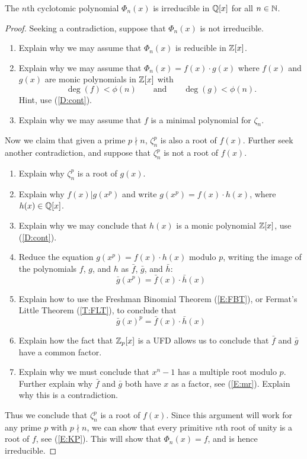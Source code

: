 \documentclass{ximera}
\begin{document}
\begin{theorem} 
  The $n$th cyclotomic polynomial $\Phi_n(x)$ is irreducible in $\mathbb Q[x]$
  for all $n\in \mathbb N$.
  \begin{proof} 
    Seeking a contradiction, suppose that $\Phi_n(x)$ is not irreducible.
    \begin{enumerate}
    \item Explain why we may assume that $\Phi_n(x)$ is reducible in
      $\mathbb Z[x]$.
    \item Explain why we may assume that $\Phi_n(x) = f(x)\cdot g(x)$
      where $f(x)$ and $g(x)$ are monic polynomials in $\mathbb Z[x]$ with
      \[
      \deg(f) < \phi(n) \qquad \text{and}\qquad \deg(g) < \phi(n).
      \]
      Hint, use (\ref{D:cont}).
\item Explain why we may assume that $f$ is a minimal polynomial for
  $\zeta_n$.
    \end{enumerate}
    Now we claim that given a prime $p \nmid n$, $\zeta_n^p$ is also a
    root of $f(x)$. Further seek another contradiction, and suppose that
    $\zeta_n^p$ is not a root of $f(x)$.
    \begin{enumerate}
    \item Explain why $\zeta_n^p$ is a root of $g(x)$.
    \item Explain why $f(x) | g(x^p)$ and write $g(x^p) = f(x) \cdot
      h(x)$, where $h(x)\in \mathbb Q[x]$.
    \item Explain why we may conclude that $h(x)$ is a monic polynomial
      $\mathbb Z[x]$, use (\ref{D:cont}).
    \item Reduce the equation $g(x^p) = f(x) \cdot h(x)$ modulo $p$,
      writing the image of the polynomials $f$, $g$, and $h$ as $\bar{f}$,
      $\bar{g}$, and $\bar{h}$:
      \[
      \bar{g}(x^p) = \bar{f}(x) \cdot \bar{h}(x)
      \]
    \item Explain how to use the Freshman Binomial Theorem (\ref{E:FBT}),
      or Fermat's Little Theorem (\ref{T:FLT}), to conclude that
      \[
      \bar{g}(x)^p = \bar{f}(x) \cdot \bar{h}(x)
      \]
    \item Explain how the fact that $\mathbb Z_p[x]$ is a UFD allows us to
      conclude that $\bar{f}$ and $\bar{g}$ have a common factor.
    \item Explain why we must conclude that $x^n-1$ has a multiple root
      modulo $p$. Further explain why $\bar{f}$ and $\bar{g}$ both have
  $x$ as a factor, see (\ref{E:mr}). Explain why this is a
      contradiction.
    \end{enumerate}
    Thus we conclude that $\zeta^p_n$ is a root of $f(x)$. Since this
    argument will work for any prime $p$ with $p\nmid n$, we can show that
    every primitive $n$th root of unity is a root of $f$, see (\ref{E:KP}). This will
    show that $\Phi_n(x) = f$, and is hence irreducible.
  \end{proof}
\end{theorem}
\end{document}
